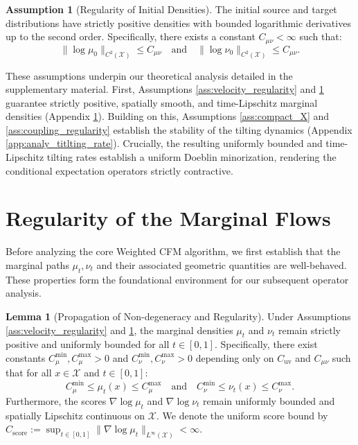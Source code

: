 \documentclass[11pt]{article}
\theoremstyle{definition}
\newtheorem{assumption}[theorem]{Assumption}
\newtheorem{lemma}[theorem]{Lemma}
\numberwithin{equation}{section}%
\begin{document}
{\begin{assumption}[Regularity of Initial Densities]
\label{ass:initial_regularity}
The initial source and target distributions have strictly positive densities with bounded logarithmic derivatives up to the second order. Specifically, there exists a constant $C_{\mu \nu} < \infty$ such that:
\begin{equation}
\|\log \mu_0\|_{C^2(\mathcal{X})} \le C_{\mu \nu} \quad \text{and} \quad \|\log \nu_0\|_{C^2(\mathcal{X})} \le C_{\mu \nu}.
\end{equation}
\end{assumption}

These assumptions underpin our theoretical analysis detailed in the supplementary material. First, Assumptions \ref{ass:velocity_regularity} and \ref{ass:initial_regularity} guarantee strictly positive, spatially smooth, and time-Lipschitz marginal densities (Appendix \ref{app:reg_marginal_flows}). Building on this, Assumptions \ref{ass:compact_X} and \ref{ass:coupling_regularity} establish the stability of the tilting dynamics (Appendix \ref{app:analy_titlting_rate}). Crucially, the resulting uniformly bounded and time-Lipschitz tilting rates establish a uniform Doeblin minorization, rendering the conditional expectation operators strictly contractive.


\section{Regularity of the Marginal Flows}
\label{app:reg_marginal_flows}
Before analyzing the core Weighted CFM algorithm, we first establish that the marginal paths $\mu_t, \nu_t$ and their associated geometric quantities are well-behaved. These properties form the foundational environment for our subsequent operator analysis.
\begin{lemma}[Propagation of Non-degeneracy and Regularity]
\label{lem:density_bounds}
Under Assumptions \ref{ass:velocity_regularity} and \ref{ass:initial_regularity}, the marginal densities $\mu_t$ and $\nu_t$ remain strictly positive and uniformly bounded for all $t \in [0,1]$. Specifically, there exist constants $C_{\mu}^{\min}, C_{\mu}^{\max} > 0$ and $C_{\nu}^{\min}, C_{\nu}^{\max} > 0$ depending only on $C_{\mathrm{uv}}$ and $C_{\mu \nu}$ such that for all $x \in \mathcal{X}$ and $t \in [0,1]$:
\begin{equation*}
C_{\mu}^{\min} \le \mu_t(x) \le C_{\mu}^{\max} \quad \text{and} \quad C_{\nu}^{\min} \le \nu_t(x) \le C_{\nu}^{\max}.
\end{equation*}
Furthermore, the scores $\nabla \log \mu_t$ and $\nabla \log \nu_t$ remain uniformly bounded and spatially Lipschitz continuous on $\mathcal{X}$. We denote the uniform score bound by $C_{\mathrm{score}} := \sup_{t\in[0,1]}\|\nabla\log\mu_t\|_{L^\infty(\mathcal{X})} < \infty$.
\end{lemma}

}
\end{document}
